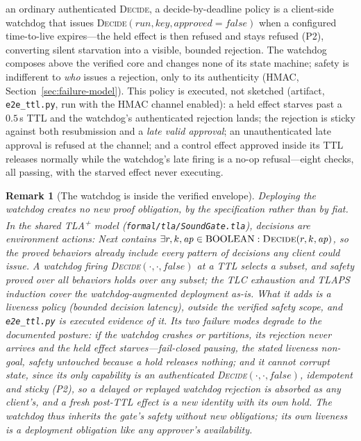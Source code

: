\documentclass[10pt,journal,compsoc]{IEEEtran}
\newtheorem{remark}{Remark}
\begin{document}
an ordinary authenticated \textsc{Decide}, a decide-by-deadline policy is a
client-side watchdog that issues
\textsc{Decide}$(\mathit{run},\mathit{key},\mathit{approved}{=}\mathit{false})$
when a configured time-to-live expires---the held effect is then refused and
stays refused (P2), converting silent starvation into a visible, bounded
rejection. The watchdog composes above the verified core and changes none of
its state machine; safety is indifferent to \emph{who} issues a rejection,
only to its authenticity (HMAC, Section~\ref{sec:failure-model}). This
policy is executed, not sketched (artifact, \texttt{e2e\_ttl.py}, run with
the HMAC channel enabled): a held effect starves past a $0.5$\,s TTL and the
watchdog's authenticated rejection lands; the rejection is sticky against
both resubmission and a \emph{late valid approval}; an unauthenticated late
approval is refused at the channel; and a control effect approved inside its
TTL releases normally while the watchdog's late firing is a no-op
refusal---eight checks, all passing, with the starved effect never
executing.

\begin{remark}[The watchdog is inside the verified envelope]
\label{rem:watchdog}
Deploying the watchdog creates no new proof obligation, by the specification
rather than by fiat. In the shared TLA\textsuperscript{+} model
(\texttt{formal/tla/SoundGate.tla}), decisions are environment actions:
\textsf{Next} contains $\exists r,k,\mathit{ap}\in\mathrm{BOOLEAN}:
\textsc{Decide}(r,k,\mathit{ap})$, so the proved behaviors already include
\emph{every} pattern of decisions any client could issue. A watchdog firing
\textsc{Decide}$(\cdot,\cdot,\mathit{false})$ at a TTL selects a subset, and
safety proved over all behaviors holds over any subset; the TLC exhaustion and
TLAPS induction cover the watchdog-augmented deployment as-is. What it adds is a
liveness \emph{policy} (bounded decision latency), outside the verified safety
scope, and \texttt{e2e\_ttl.py} is executed evidence of it. Its two failure
modes degrade to the documented posture: if the watchdog crashes or partitions,
its rejection never arrives and the held effect starves---fail-closed pausing,
the stated liveness non-goal, safety untouched because a hold releases nothing;
and it cannot corrupt state, since its only capability is an authenticated
\textsc{Decide}$(\cdot,\cdot,\mathit{false})$, idempotent and sticky (P2), so a
delayed or replayed watchdog rejection is absorbed as any client's, and a fresh
post-TTL effect is a new identity with its own hold. The watchdog thus inherits
the gate's safety without new obligations; its own \emph{liveness} is a
deployment obligation like any approver's availability.
\end{remark}
\end{document}
